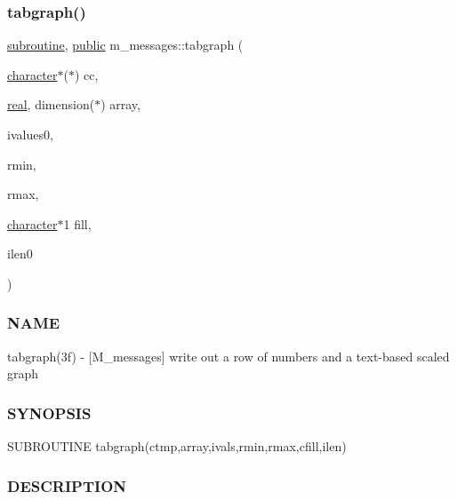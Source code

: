 \subsubsection{\texorpdfstring{tabgraph()}{tabgraph()}}
{\footnotesize\ttfamily \hyperlink{M__stopwatch_83_8txt_acfbcff50169d691ff02d4a123ed70482}{subroutine}, \hyperlink{M__stopwatch_83_8txt_a2f74811300c361e53b430611a7d1769f}{public} m\+\_\+messages\+::tabgraph (\begin{DoxyParamCaption}\item[{\hyperlink{option__stopwatch_83_8txt_abd4b21fbbd175834027b5224bfe97e66}{character}$\ast$($\ast$)}]{cc,  }\item[{\hyperlink{read__watch_83_8txt_abdb62bde002f38ef75f810d3a905a823}{real}, dimension($\ast$)}]{array,  }\item[{}]{ivalues0,  }\item[{}]{rmin,  }\item[{}]{rmax,  }\item[{\hyperlink{option__stopwatch_83_8txt_abd4b21fbbd175834027b5224bfe97e66}{character}$\ast$1}]{fill,  }\item[{}]{ilen0 }\end{DoxyParamCaption})}



\subsubsection*{N\+A\+ME}

tabgraph(3f) -\/ \mbox{[}M\+\_\+messages\mbox{]} write out a row of numbers and a text-\/based scaled graph 

\subsubsection*{S\+Y\+N\+O\+P\+S\+IS}

\begin{DoxyVerb}   SUBROUTINE tabgraph(ctmp,array,ivals,rmin,rmax,cfill,ilen)
\end{DoxyVerb}


\subsubsection*{D\+E\+S\+C\+R\+I\+P\+T\+I\+ON}


